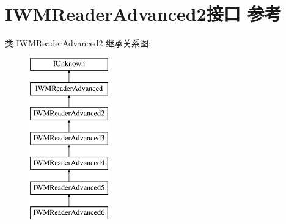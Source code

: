 \hypertarget{interface_i_w_m_reader_advanced2}{}\section{I\+W\+M\+Reader\+Advanced2接口 参考}
\label{interface_i_w_m_reader_advanced2}
类 I\+W\+M\+Reader\+Advanced2 继承关系图\+:\begin{figure}[H]
\begin{center}
\leavevmode
\includegraphics[height=7.000000cm]{interface_i_w_m_reader_advanced2}
\end{center}
\end{figure}
